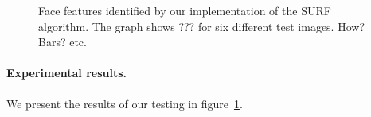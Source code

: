 \begin{figure}
  \caption[Bluh]{Face features identified by our implementation of the SURF algorithm. The graph shows ??? for six different test images. How? Bars? etc.}
  \label{fig:face-features-hits}
\end{figure}

\paragraph{Experimental results.}
We present the results of our testing in figure~\ref{fig:face-features-hits}.

